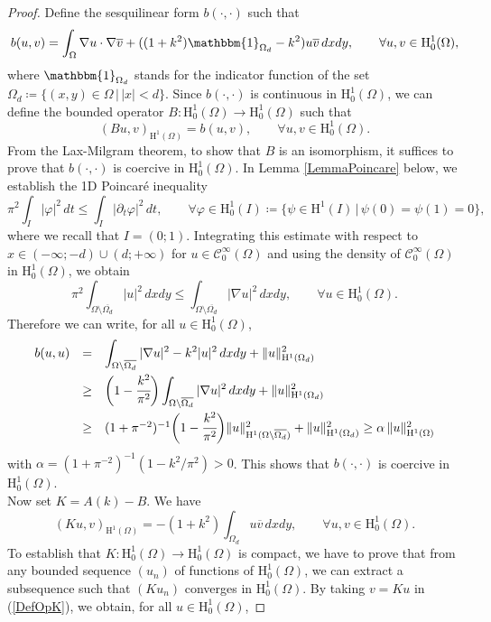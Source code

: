 \documentclass[11pt,a4paper]{report}
\newcommand{\dsp}{\displaystyle}
\newcommand{\Om}{\Omega}
\newcommand{\mrm}[1]{\mathrm{#1}}
\newcommand{\mH}{\mrm{H}}
\begin{document}
\begin{proof}
Define the sesquilinear form $b(\cdot,\cdot)$ such that 
\[
b(u,v)=\int_{\Om}\nabla u\cdot\nabla \overline{v}+((1+k^2)\mathbbm{1}_{\Om_d}-k^2) u\overline{v}\,dxdy,\qquad\forall u,v\in \mH^1_0(\Om),
\]
where $\mathbbm{1}_{\Om_d}$ stands for the indicator function of the set $\Om_d\coloneqq\{(x,y)\in\Om\,|\,|x|<d\}$. Since $b(\cdot,\cdot)$ is continuous in $\mH^1_0(\Om)$, we can define the bounded operator $B:\mH^1_0(\Om)\to\mH^1_0(\Om)$ such that 
\[
(Bu,v)_{\mH^1(\Om)}=b(u,v),\qquad\forall u,v\in \mH^1_0(\Om).
\]
From the Lax-Milgram theorem, to show that $B$ is an isomorphism, it suffices to prove that $b(\cdot,\cdot)$ is coercive in $\mH^1_0(\Om)$. In Lemma \ref{LemmaPoincare} below, we establish the 1D Poincar\'e inequality 
\begin{equation}\label{Poincare1D}
\pi^2\int_I |\varphi|^2\,dt \le \int_I |\partial_t\varphi|^2\,dt,\qquad\forall \varphi\in\mH^1_0(I)\coloneqq\{\psi\in\mH^1(I)\,|\,\psi(0)=\psi(1)=0\},
\end{equation}
where we recall that $I=(0;1)$. Integrating this estimate with respect to $x\in(-\infty;-d)\cup(d;+\infty)$ for $u\in\mathscr{C}^\infty_0(\Om)$ and using the density of $\mathscr{C}^\infty_0(\Om)$ in $\mH^1_0(\Om)$, we obtain
\[
\pi^2\int_{\Om\setminus\overline{\Om_d}}|u|^2\,dxdy \le \int_{\Om\setminus\overline{\Om_d}}|\nabla u|^2\,dxdy,\qquad\forall u\in\mH^1_0(\Om).
\]
Therefore we can write, for all $u\in\mH^1_0(\Om)$,
\[
\begin{array}{rcl}
b(u,u)& = & \dsp\int_{\Om\setminus\overline{\Om_d}}|\nabla u|^2-k^2 |u|^2\,dxdy+\|u\|^2_{\mH^1(\Om_d)} \\[10pt]
& \ge & \dsp\bigg(1-\cfrac{k^2}{\pi^2}\bigg)\int_{\Om\setminus\overline{\Om_d}}|\nabla u|^2\,dxdy+\|u\|^2_{\mH^1(\Om_d)} \\[10pt]
& \ge & (1+\pi^{-2})^{-1}\bigg(1-\cfrac{k^2}{\pi^2}\bigg)\|u\|^2_{\mH^1(\Om\setminus\overline{\Om_d})}+\|u\|^2_{\mH^1(\Om_d)} \ge \alpha\,\|u\|^2_{\mH^1(\Om)}
\end{array}
\]
with $\alpha=(1+\pi^{-2})^{-1}(1-k^2/\pi^2)>0$. This shows that $b(\cdot,\cdot)$ is coercive in $\mH^1_0(\Om)$.\\
\newline
Now set $K=A(k)-B$. We have 
\begin{equation}\label{DefOpK}
(Ku,v)_{\mH^1(\Om)}=-(1+k^2)\int_{\Om_d}u\overline{v}\,dxdy,\qquad\forall u,v\in \mH^1_0(\Om).
\end{equation}
To establish that $K:\mH^1_0(\Om)\to\mH^1_0(\Om)$ is compact, we have to prove that from any bounded sequence $(u_n)$ of functions of $\mH^1_0(\Om)$, we can extract a subsequence such that $(Ku_n)$ converges in $\mH^1_0(\Om)$. By taking $v=Ku$ in (\ref{DefOpK}), we obtain, for all $u\in\mH^1_0(\Om)$, 

\end{proof}
\end{document}
